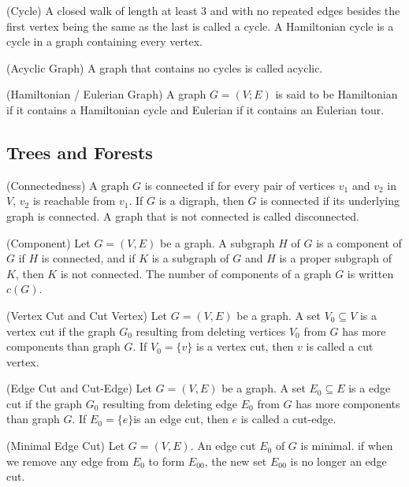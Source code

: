 \begin{definition}{ (Cycle)}
A closed walk of length at least 3 and with no repeated edges besides the first vertex being the same as the last is called a cycle.
A Hamiltonian cycle is a cycle in a graph containing every vertex.
\end{definition}
%
\begin{definition}{(Acyclic Graph)}
A graph that contains no cycles is called acyclic.
\end{definition}
%
\begin{definition}{(Hamiltonian / Eulerian Graph)}
A graph \(G = (V;E)\) is said to be Hamiltonian if it contains a Hamiltonian cycle and Eulerian if it contains an Eulerian tour.
\end{definition}

%
\subsection{Trees and Forests}
%
\begin{definition}{(Connectedness)}
A graph \(G\) is connected if for every pair of vertices \(v_1\) and \(v_2\) in \(V\), \(v_2\) is reachable from \(v_1\).
If \(G\) is a digraph, then \(G\) is connected if its underlying graph is connected.
A graph that is not connected is called disconnected.
\end{definition}

\begin{definition}{(Component)}
Let \(G = (V,E)\) be a graph.
A subgraph \(H\) of \(G\) is a component of \(G\) if $H$ is connected, and
 if \(K\) is a subgraph of \(G\) and \(H\) is a proper subgraph of \(K\), then \(K\) is not connected.
%
The number of components of a graph \(G\) is written \(c(G)\).
\end{definition}
%

\begin{definition}{(Vertex Cut and Cut Vertex)}
Let \(G = (V,E)\) be a graph.
A set \(V_0 \subseteq V\) is a vertex cut if the graph \(G_0\) resulting from deleting vertices \(V_0\) from \(G\) has more components than graph \(G\).
If \(V_0 = \{v\}\) is a vertex cut, then \(v\) is called a cut vertex.
\end{definition}
%
\begin{definition}{(Edge Cut and Cut-Edge)}
Let \(G = (V,E)\) be a graph.
A set \(E_0\subseteq E\) is a edge cut if the graph \(G_0\) resulting from deleting edge \(E_0\) from \(G\) has more components than graph \(G\).
If \(E_0 = \{e\}\)is an edge cut, then \(e\) is called a cut-edge.
\end{definition}
%
\begin{definition}{(Minimal Edge Cut)}
Let \(G = (V,E)\).
An edge cut \(E_0\) of \(G\) is minimal.
if when we remove any edge from \(E_0\) to form \(E_{00}\), the new set \(E_{00}\) is no longer an edge cut.
\end{definition}

